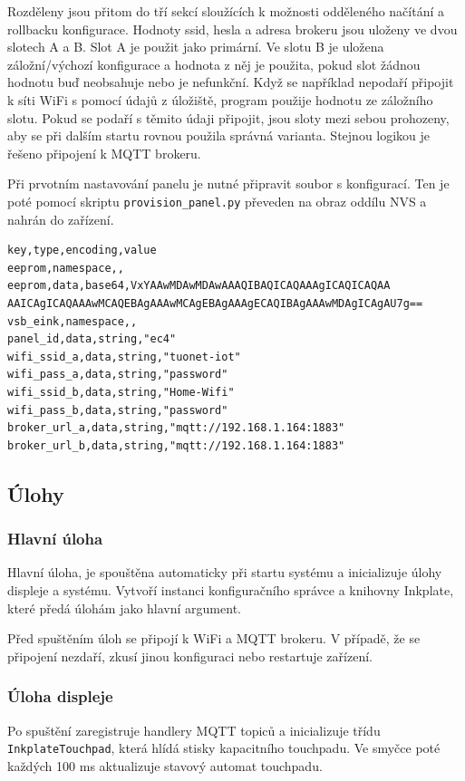Rozděleny jsou přitom do tří sekcí sloužících k možnosti odděleného načítání a rollbacku konfigurace. Hodnoty ssid, hesla a adresa brokeru jsou uloženy ve dvou slotech A a B. Slot A je použit jako primární. Ve slotu B je uložena záložní/výchozí konfigurace a hodnota z něj je použita, pokud slot žádnou hodnotu buď neobsahuje nebo je nefunkční. Když se například nepodaří připojit k síti WiFi s pomocí údajů z úložiště, program použije hodnotu ze záložního slotu. Pokud se podaří s těmito údaji připojit, jsou sloty mezi sebou prohozeny, aby se při dalším startu rovnou použila správná varianta. Stejnou logikou je řešeno připojení k MQTT brokeru.

Při prvotním nastavování panelu je nutné připravit soubor s konfigurací. Ten je poté pomocí skriptu \lstinline{provision_panel.py} převeden na obraz oddílu NVS a nahrán do zařízení.

\begin{lstlisting}[label=src:example-nvs-csv,caption={Ukázkový provizní soubor, řádek "eepro,data" rozdělen pro účel prezentace}]
key,type,encoding,value
eeprom,namespace,,
eeprom,data,base64,VxYAAwMDAwMDAwAAAQIBAQICAQAAAgICAQICAQAA AAICAgICAQAAAwMCAQEBAgAAAwMCAgEBAgAAAgECAQIBAgAAAwMDAgICAgAU7g==
vsb_eink,namespace,,
panel_id,data,string,"ec4"
wifi_ssid_a,data,string,"tuonet-iot"
wifi_pass_a,data,string,"password"
wifi_ssid_b,data,string,"Home-Wifi"
wifi_pass_b,data,string,"password"
broker_url_a,data,string,"mqtt://192.168.1.164:1883"
broker_url_b,data,string,"mqtt://192.168.1.164:1883"
\end{lstlisting}

\subsection{Úlohy}
\subsubsection{Hlavní úloha}
Hlavní úloha, je spouštěna automaticky při startu systému a inicializuje úlohy displeje a systému. Vytvoří instanci konfiguračního správce a knihovny Inkplate, které předá úlohám jako hlavní argument.

Před spuštěním úloh se připojí k WiFi a MQTT brokeru. V případě, že se připojení nezdaří, zkusí jinou konfiguraci nebo restartuje zařízení.

\subsubsection{Úloha displeje}
Po spuštění zaregistruje handlery MQTT topiců a inicializuje třídu \lstinline|InkplateTouchpad|, která hlídá stisky kapacitního touchpadu. Ve smyčce poté každých 100 ms aktualizuje stavový automat touchpadu.

